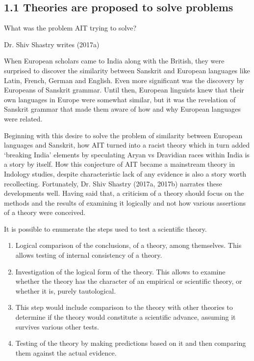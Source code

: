 \subsection*{1.1 Theories are proposed to solve problems}

What was the problem AIT trying to solve?

Dr. Shiv Shastry writes (2017a)

\begin{myquote}
When European scholars came to India along with the British, they were surprised to discover the similarity between Sanskrit and European languages like Latin, French, German and English. Even more significant was the discovery by Europeans of Sanskrit grammar. Until then, European linguists knew that their own languages in Europe were somewhat similar, but it was the revelation of Sanskrit grammar that made them aware of how and why European languages were related.
\end{myquote}

Beginning with this desire to solve the problem of similarity between European languages and Sanskrit, how AIT turned into a racist theory which in turn added ‘breaking India’ elements by speculating Aryan vs Dravidian races within India is a story by itself. How this conjecture of AIT became a mainstream theory in Indology studies, despite characteristic lack of any evidence is also a story worth recollecting. Fortunately, Dr. Shiv Shastry (2017a, 2017b) narrates these developments well. Having said that, a criticism of a theory should focus on the methods and the results of examining it logically and not how various assertions of a theory were conceived.

It is possible to enumerate the steps used to test a scientific theory.

\begin{enumerate}[{\rm 1)}]
\itemsep=0pt
\item Logical comparison of the conclusions, of a theory, among themselves. This allows testing of internal consistency of a theory.

 \newpage

 \item Investigation of the logical form of the theory. This allows to examine whether the theory has the character of an empirical or scientific theory, or whether it is, purely tautological.

 \item This step would include comparison to the theory with other theories to determine if the theory would constitute a scientific advance, assuming it survives various other tests.

 \item Testing of the theory by making predictions based on it and then comparing them against the actual evidence.

\end{enumerate}

